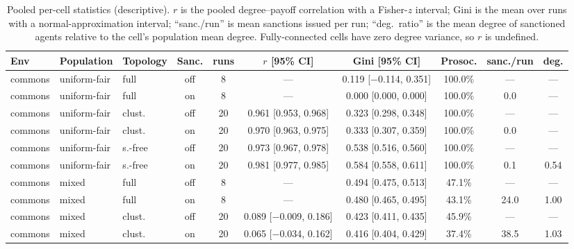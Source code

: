 \documentclass[11pt,a4paper]{article}
\begin{document}
%
\begin{table}[htbp]
\centering
\scriptsize
\setlength{\tabcolsep}{2.2pt}
\caption{Pooled per-cell statistics (descriptive). $r$ is the pooled
degree--payoff correlation with a Fisher-$z$ interval; Gini is the
mean over runs with a normal-approximation interval; ``sanc./run'' is
mean sanctions issued per run; ``deg.\ ratio'' is the mean degree of
sanctioned agents relative to the cell's population mean degree.
Fully-connected cells have zero degree variance, so $r$ is undefined.}
\label{tab:pooled}
\begin{tabular}{lllccccccc}
\toprule
Env & Population & Topology & Sanc. & runs & $r$ [95\% CI] & Gini [95\% CI] & Prosoc. & sanc./run & deg. \\
\midrule
commons & uniform-fair & full & off & 8 & --- & 0.119 [$-$0.114, 0.351] & 100.0\% & --- & --- \\
commons & uniform-fair & full & on & 8 & --- & 0.000 [0.000, 0.000] & 100.0\% & 0.0 & --- \\
commons & uniform-fair & clust. & off & 20 & 0.961 [0.953, 0.968] & 0.323 [0.298, 0.348] & 100.0\% & --- & --- \\
commons & uniform-fair & clust. & on & 20 & 0.970 [0.963, 0.975] & 0.333 [0.307, 0.359] & 100.0\% & 0.0 & --- \\
commons & uniform-fair & s.-free & off & 20 & 0.973 [0.967, 0.978] & 0.538 [0.516, 0.560] & 100.0\% & --- & --- \\
commons & uniform-fair & s.-free & on & 20 & 0.981 [0.977, 0.985] & 0.584 [0.558, 0.611] & 100.0\% & 0.1 & 0.54 \\
commons & mixed & full & off & 8 & --- & 0.494 [0.475, 0.513] & 47.1\% & --- & --- \\
commons & mixed & full & on & 8 & --- & 0.480 [0.465, 0.495] & 43.1\% & 24.0 & 1.00 \\
commons & mixed & clust. & off & 20 & 0.089 [$-$0.009, 0.186] & 0.423 [0.411, 0.435] & 45.9\% & --- & --- \\
commons & mixed & clust. & on & 20 & 0.065 [$-$0.034, 0.162] & 0.416 [0.404, 0.429] & 37.4\% & 38.5 & 1.03 \\

\end{tabular}
\end{table}
\end{document}
